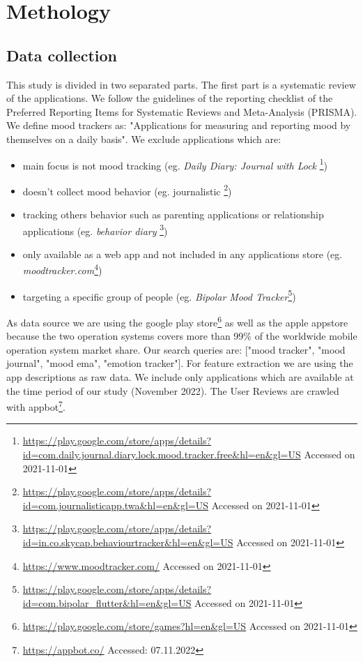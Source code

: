 \chapter{Methology}
\label{ch:methology}
\section{Data collection}
\label{sec:data-collection}
This study is divided in two separated parts. The first part is a systematic review of the applications. We follow the guidelines of the reporting checklist of the Preferred Reporting Items for Systematic Reviews and Meta-Analysis (PRISMA\cite{moher2015preferred}).
We define mood trackers as:
"Applications for measuring and reporting mood by themselves on a daily basis".
We exclude applications which are:
\begin{itemize}
    \item main focus is not mood tracking (eg. \textit{Daily Diary: Journal with Lock} \footnote{\url{https://play.google.com/store/apps/details?id=com.daily.journal.diary.lock.mood.tracker.free&hl=en&gl=US} Accessed on 2021-11-01})
    \item doesn't collect mood behavior (eg. journalistic \footnote{\url{https://play.google.com/store/apps/details?id=com.journalisticapp.twa&hl=en&gl=US} Accessed on 2021-11-01})
    \item tracking others behavior such as parenting applications or relationship applications (eg. \textit{behavior diary} \footnote{\url{https://play.google.com/store/apps/details?id=in.co.skycap.behaviourtracker&hl=en&gl=US} Accessed on 2021-11-01})
    \item only available as a web app and not included in any applications store (eg. \textit{moodtracker.com}\footnote{\url{https://www.moodtracker.com/} Accessed on 2021-11-01})
    \item targeting a specific group of people (eg. \textit{Bipolar Mood Tracker}\footnote{\url{https://play.google.com/store/apps/details?id=com.bipolar_flutter&hl=en&gl=US} Accessed on 2021-11-01})
\end{itemize}
As data source we are using the google play store\footnote{\url{https://play.google.com/store/games?hl=en&gl=US} Accessed on 2021-11-01 } as well as the apple appstore because the two operation systems covers more than 99\% of the worldwide mobile operation system market share.
Our search queries are: ["mood tracker", "mood journal", "mood ema", "emotion tracker"].
For feature extraction we are using the app descriptions as raw data. We include only applications which are available at the time period of our study (November 2022).
The User Reviews are crawled with appbot\footnote{\url{https://appbot.co/} Accessed: 07.11.2022}.

